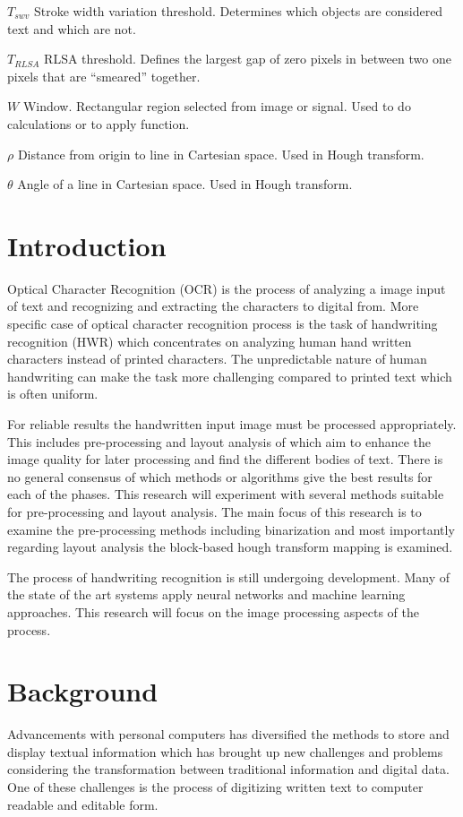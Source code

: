\documentclass{article}
\begin{document}
\begin{abbrv}
    \item[$T_{swv}$] Stroke width variation threshold. Determines which objects are considered text and which are not.
    \item[$T_{RLSA}$] RLSA threshold. Defines the largest gap of zero pixels in between two one pixels that are ``smeared'' together.
    \item[$W$] Window. Rectangular region selected from image or signal. Used to do calculations or to apply function.
    \item[$\rho$] Distance from origin to line in Cartesian space. Used in Hough transform.
    \item[$\theta$] Angle of a line in Cartesian space. Used in Hough transform.
   \end{abbrv}

   \newpage
   \section{Introduction}
    Optical Character Recognition (OCR) is the process of analyzing a image input of  text and recognizing and extracting the characters to digital from. More specific case of optical character recognition process is the task of handwriting recognition (HWR) which concentrates on analyzing human hand written characters instead of printed characters. The unpredictable nature of human handwriting can make the task more challenging compared to printed text which is often uniform.

    For reliable results the handwritten input image must be processed appropriately. This includes pre-processing and layout analysis of which aim to enhance the image quality for later processing and find the different bodies of text. There is no general consensus of which methods or algorithms give the best results for each of the phases. This research will experiment with several methods suitable for pre-processing and layout analysis. The main focus of this research is to examine the pre-processing methods including binarization and most importantly regarding layout analysis the block-based hough transform mapping is examined.

    The process of handwriting recognition is still undergoing development. Many of the state of the art systems apply neural networks and machine learning approaches. This research will focus on the image processing aspects of the process.

  \newpage
  \section{Background}
    Advancements with personal computers has diversified the methods to store and display textual information which has brought up new challenges and problems considering the transformation between traditional information and digital data. One of these challenges is the process of digitizing written text to computer readable and editable form.
\end{document}

